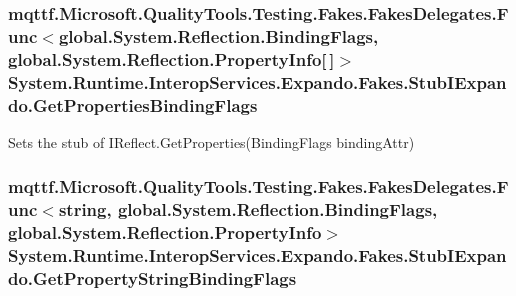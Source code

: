 \hypertarget{class_system_1_1_runtime_1_1_interop_services_1_1_expando_1_1_fakes_1_1_stub_i_expando_a1eef8a29c380f4200e153da0aa322230}{
\subsubsection[{Get\-Properties\-Binding\-Flags}]{\setlength{\rightskip}{0pt plus 5cm}mqttf.\-Microsoft.\-Quality\-Tools.\-Testing.\-Fakes.\-Fakes\-Delegates.\-Func$<$global.\-System.\-Reflection.\-Binding\-Flags, global.\-System.\-Reflection.\-Property\-Info\mbox{[}$\,$\mbox{]}$>$ System.\-Runtime.\-Interop\-Services.\-Expando.\-Fakes.\-Stub\-I\-Expando.\-Get\-Properties\-Binding\-Flags}}\label{class_system_1_1_runtime_1_1_interop_services_1_1_expando_1_1_fakes_1_1_stub_i_expando_a1eef8a29c380f4200e153da0aa322230}


Sets the stub of I\-Reflect.\-Get\-Properties(\-Binding\-Flags binding\-Attr)

\hypertarget{class_system_1_1_runtime_1_1_interop_services_1_1_expando_1_1_fakes_1_1_stub_i_expando_a23789f330b665a31802dbaa76635a22f}{
\subsubsection[{Get\-Property\-String\-Binding\-Flags}]{\setlength{\rightskip}{0pt plus 5cm}mqttf.\-Microsoft.\-Quality\-Tools.\-Testing.\-Fakes.\-Fakes\-Delegates.\-Func$<$string, global.\-System.\-Reflection.\-Binding\-Flags, global.\-System.\-Reflection.\-Property\-Info$>$ System.\-Runtime.\-Interop\-Services.\-Expando.\-Fakes.\-Stub\-I\-Expando.\-Get\-Property\-String\-Binding\-Flags}}\label{class_system_1_1_runtime_1_1_interop_services_1_1_expando_1_1_fakes_1_1_stub_i_expando_a23789f330b665a31802dbaa76635a22f}


